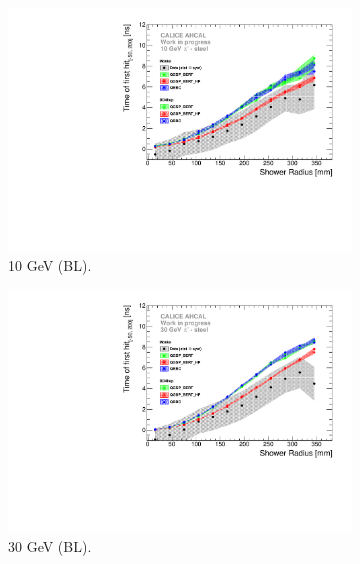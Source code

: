 \begin{figure}[htbp!]
	\begin{subfigure}[t]{0.5\textwidth}
		\centering
		\includegraphics[width=1\textwidth]{../Thesis_Plots/Timing/Pions/Plots/ComparisonToSim/Time_Radius_10GeV_BL.pdf}
		\caption{10 GeV (BL).}\label{fig:Radius_BL_SimData_10GeV}
	\end{subfigure}
	\hfill
	\begin{subfigure}[t]{0.5\textwidth}
		\centering
		\includegraphics[width=1\textwidth]{../Thesis_Plots/Timing/Pions/Plots/ComparisonToSim/Time_Radius_30GeV_BL.pdf}
		\caption{30 GeV (BL).} \label{fig:Radius_BL_SimData_30GeV}
	\end{subfigure}
	\hfill
	\begin{subfigure}[t]{0.5\textwidth}
		\centering

\end{subfigure}
\end{figure}
